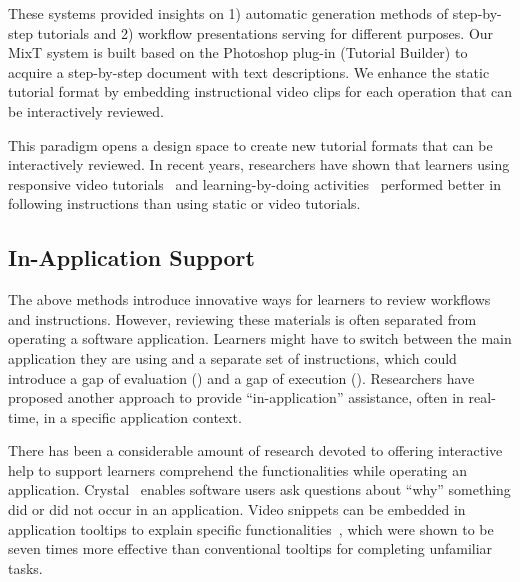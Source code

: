 These systems provided insights on 1) automatic generation methods of step-by-step tutorials and 2) workflow presentations serving for different purposes. Our MixT system is built based on the Photoshop plug-in (Tutorial Builder) to acquire a step-by-step document with text descriptions. We enhance the static tutorial format by embedding instructional video clips for each operation that can be interactively reviewed.

This paradigm opens a design space to create new tutorial formats that can be interactively reviewed. In recent years, researchers have shown that learners using responsive video tutorials~\cite{Nguyen:2015:MST:2702123.2702209} and learning-by-doing activities~\cite{Kwon:2016:CEO:2858036.2858101} performed better in following instructions than using static or video tutorials.


\subsection{In-Application Support}

The above methods introduce innovative ways for learners to review workflows and instructions. However, reviewing these materials is often separated from operating a software application. Learners might have to switch between the main application they are using and a separate set of instructions, which could introduce a gap of evaluation () and a gap of execution ().
%
Researchers have proposed another approach to provide ``in-application'' assistance, often in real-time, in a specific application context.

There has been a considerable amount of research devoted to offering interactive help to support learners comprehend the functionalities while operating an application.
%
Crystal~\cite{Myers:2006:AWW:1124772.1124832} enables software users ask questions about ``why'' something did or did not occur in an application.
%
Video snippets can be embedded in application tooltips to explain specific functionalities~\cite{Grossman:2010wr}, which were shown to be seven times more effective than conventional tooltips for completing unfamiliar tasks.

